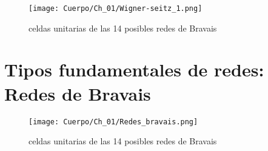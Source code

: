 \begin{figure}[h!] \centering
    \texttt{[image: Cuerpo/Ch\_01/Wigner-seitz\_1.png]}
    \caption{celdas unitarias de las 14 posibles redes de Bravais}
    \label{Fig:01-01}
\end{figure}

 \section{Tipos fundamentales de redes: Redes de Bravais}

\begin{figure}[h!] \centering
    \texttt{[image: Cuerpo/Ch\_01/Redes\_bravais.png]}
    \caption{celdas unitarias de las 14 posibles redes de Bravais}
    \label{Fig:01-01}
\end{figure}
